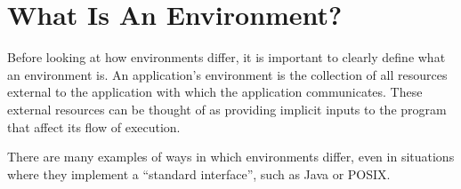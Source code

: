 \section{What Is An Environment?}

Before looking at how environments differ, it is important to clearly
define what an environment is.
An application's environment is the collection of all resources
external to the application with which the application communicates.
These external resources can be thought of as providing implicit
inputs to the program that affect its flow of execution.

There are many examples of ways in which environments differ, even in
situations where they implement a ``standard interface'', such as Java or
POSIX.

